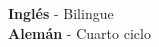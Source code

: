 

\begin{cventries}

    \begin{flushleft}
        \textnormal{{\bfseries Inglés} - Bilingue \\}
        \textnormal{{\bfseries Alemán} - Cuarto ciclo}
    \end{flushleft}

\end{cventries}
